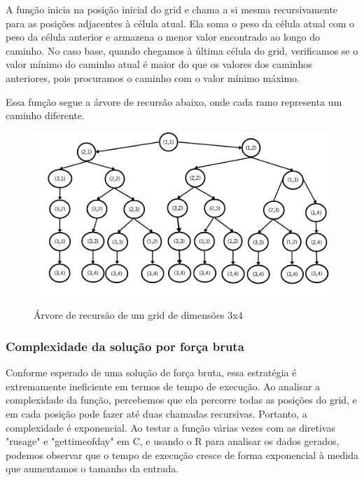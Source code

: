 \documentclass[12pt]{article}
\begin{document}
            A função inicia na posição inicial do grid e chama a si mesma recursivamente para 
            as posições adjacentes à célula atual. Ela soma o peso da célula atual com o peso 
            da célula anterior e armazena o menor valor encontrado ao longo do caminho. 
            No caso base, quando chegamos à última célula do grid, verificamos se o valor mínimo 
            do caminho atual é maior do que os valores dos caminhos anteriores, pois procuramos 
            o caminho com o valor mínimo máximo.
            
            Essa função segue a árvore de recursão abaixo, onde cada ramo representa um caminho 
            diferente.
            
            \begin{figure}[h]
                \centering
                \includegraphics[width=0.75\linewidth]{Figuras/arvoreRecursao.png}\\
                \caption{Árvore de recursão de um grid de dimensões 3x4}
                \label{fig:Arvore de recursão}
            \end{figure}
            
            \subsubsection{Complexidade da solução por força bruta}
                Conforme esperado de uma solução de força bruta, essa estratégia é extremamente 
                ineficiente em termos de tempo de execução. Ao analisar a complexidade da função, 
                percebemos que ela percorre todas as posições do grid, e em cada posição pode 
                fazer até duas chamadas recursivas. Portanto, a complexidade é exponencial. 
                Ao testar a função várias vezes com as diretivas "rusage" e "gettimeofday" em C, 
                e usando o R para analisar os dados gerados, podemos observar que o tempo de 
                execução cresce de forma exponencial à medida que aumentamos o tamanho da entrada.
\end{document}
